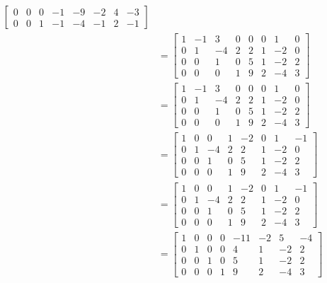 \documentclass{math}
\begin{document}
\begin{align*}
\begin{bmatrix}
    0 & 0 & 0 & -1 & -9 & -2 & 4 & -3 \\
    0 & 0 & 1 & -1 & -4 & -1 & 2 & -1
  \end{bmatrix} \\
  &= \begin{bmatrix}
    1 & -1 & 3 & 0 & 0 & 0 & 1 & 0 \\
    0 & 1 & -4 & 2 & 2 & 1 & -2 & 0 \\
    0 & 0 & 1 & 0 & 5 & 1 & -2 & 2 \\
    0 & 0 & 0 & 1 & 9 & 2 & -4 & 3
  \end{bmatrix} \\
  &= \begin{bmatrix}
    1 & -1 & 3 & 0 & 0 & 0 & 1 & 0 \\
    0 & 1 & -4 & 2 & 2 & 1 & -2 & 0 \\
    0 & 0 & 1 & 0 & 5 & 1 & -2 & 2 \\
    0 & 0 & 0 & 1 & 9 & 2 & -4 & 3
  \end{bmatrix} \\
  &= \begin{bmatrix}
    1 & 0 & 0 & 1 & -2 & 0 & 1 & -1 \\
    0 & 1 & -4 & 2 & 2 & 1 & -2 & 0 \\
    0 & 0 & 1 & 0 & 5 & 1 & -2 & 2 \\
    0 & 0 & 0 & 1 & 9 & 2 & -4 & 3
  \end{bmatrix} \\
  &= \begin{bmatrix}
    1 & 0 & 0 & 1 & -2 & 0 & 1 & -1 \\
    0 & 1 & -4 & 2 & 2 & 1 & -2 & 0 \\
    0 & 0 & 1 & 0 & 5 & 1 & -2 & 2 \\
    0 & 0 & 0 & 1 & 9 & 2 & -4 & 3
  \end{bmatrix} \\
  &= \begin{bmatrix}
    1 & 0 & 0 & 0 & -11 & -2 & 5 & -4 \\
    0 & 1 & 0 & 0 & 4 & 1 & -2 & 2 \\
    0 & 0 & 1 & 0 & 5 & 1 & -2 & 2 \\
    0 & 0 & 0 & 1 & 9 & 2 & -4 & 3
  \end{bmatrix}
\end{align*}
\end{document}
